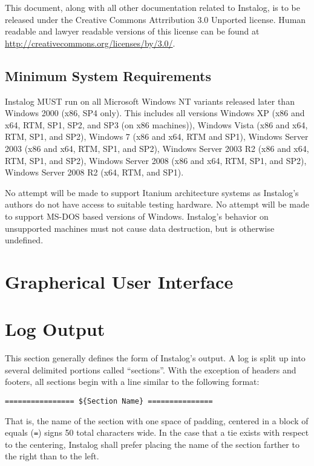 \documentclass[letterpaper,12pt]{article}
\begin{document}
This document, along with all other documentation related to Instalog,  is to be
released under the Creative Commons Attrribution 3.0 Unported license. Human
readable and lawyer readable versions of this license can be found at
\url{http://creativecommons.org/licenses/by/3.0/}.

\subsection{Minimum System Requirements}
Instalog MUST run on all Microsoft Windows NT variants released later than
Windows 2000 (x86, SP4 only). This includes all versions Windows XP (x86 and
x64, RTM, SP1, SP2, and SP3 (on x86 machines)), Windows Vista (x86 and x64, RTM,
SP1, and SP2), Windows 7 (x86 and x64, RTM and SP1), Windows Server 2003 (x86
and x64, RTM, SP1, and SP2), Windows Server 2003 R2 (x86 and x64, RTM, SP1, and
SP2), Windows Server 2008 (x86 and x64, RTM, SP1, and SP2), Windows Server 2008
R2 (x64, RTM, and SP1).

No attempt will be made to support Itanium architecture systems as Instalog's
authors do not have access to suitable testing hardware. No attempt will be made
to support MS-DOS based versions of Windows. Instalog's behavior on unsupported
machines must not cause data destruction, but is otherwise undefined.

\section{Grapherical User Interface}
\section{Log Output}
This section generally defines the form of Instalog's output. A log is split up
into several delimited portions called ``sections''. With the exception of
headers and footers, all sections begin with a line similar to the following
format:

\begin{verbatim}
================ ${Section Name} ===============
\end{verbatim}

That is, the name of the section with one space of padding, centered in a block
of equals (\verb|=|) signs 50 total characters wide. In the case that a tie
exists with respect to the centering, Instalog shall prefer placing the name of the
section farther to the right than to the left.
\end{document}
